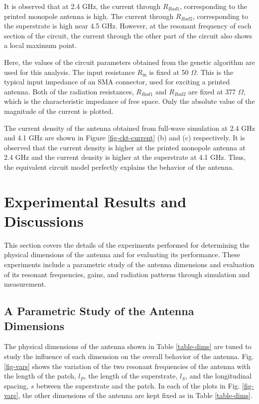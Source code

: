 It is observed that at 2.4 GHz, the current through $R_{Rad1}$, corresponding to the printed monopole antenna is high. The current through $R_{Rad2}$, corresponding to the superstrate is high near 4.5 GHz. However, at the resonant frequency of each section of the circuit, the current through the other part of the circuit also shows a local maximum point.

Here, the values of the circuit parameters obtained from the genetic algorithm are used for this analysis. The input resistance $R_{\text{in}}$ is fixed at 50 $\Omega$. This is the typical input impedance of an SMA connector, used for exciting a printed antenna. Both of the radiation resistances, $R_{Rad1}$ and $R_{Rad2}$ are fixed at 377 $\Omega$, which is the characteristic impedance of free space. Only the absolute value of the magnitude of the current is plotted.

The current density of the antenna obtained from full-wave simulation at 2.4 GHz and 4.1 GHz are shown in Figure \ref{fig-ckt-current} (b) and (c) respectively. It is observed that the current density is higher at the printed monopole antenna at 2.4 GHz and the current density is higher at the superstrate at 4.1 GHz. Thus, the equivalent circuit model perfectly explains the behavior of the antenna.

\section{Experimental Results and Discussions}\label{c4sec:expt_results}
This section covers the details of the experiments performed for determining the physical dimensions of the antenna and for evaluating its performance. These experiments include a parametric study of the antenna dimensions and evaluation of its resonant frequencies, gains, and radiation patterns through simulation and measurement.

\subsection{A Parametric Study of the Antenna Dimensions}
The physical dimensions of the antenna shown in Table \ref{table-dims} are tuned to study the influence of each dimension on the overall behavior of the antenna. Fig. \ref{fig-vars} shows the variation of the two resonant frequencies of the antenna with the length of the patch, $l_P$, the length of the superstrate, $l_S$, and the longitudinal spacing, $s$ between the superstrate and the patch. In each of the plots in Fig. \ref{fig-vars}, the other dimensions of the antenna are kept fixed as in Table \ref{table-dims}.

